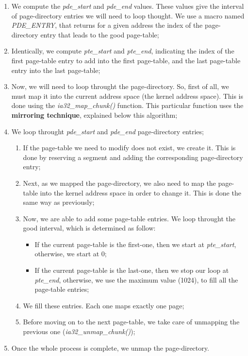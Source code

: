 \begin{enumerate}
\item
  We compute the \textit{pde\_start} and \textit{pde\_end}
  values. These values give the interval of page-directory entries we
  will need to loop thought. We use a macro named \textit{PDE\_ENTRY},
  that returns for a given address the index of the page-directory
  entry that leads to the good page-table;
\item
  Identically, we compute \textit{pte\_start} and \textit{pte\_end},
  indicating the index of the first page-table entry to add into the
  first page-table, and the last page-table entry into the last
  page-table;
\item
  Now, we will need to loop throught the page-directory. So, first of
  all, we must map it into the current address space (the kernel
  address space). This is done using the \textit{ia32\_map\_chunk()}
  function. This particular function uses the \textbf{mirroring
  technique}, explained below this algorithm;
\item
  We loop throught \textit{pde\_start} and \textit{pde\_end}
  page-directory entries;
  \begin{enumerate}
  \item
    If the page-table we need to modify does not exist, we create
    it. This is done by reserving a segment and adding the
    corresponding page-directory entry;
  \item
    Next, as we mapped the page-directory, we also need to map the
    page-table into the kernel address space in order to change
    it. This is done the same way as previously;
  \item
    Now, we are able to add some page-table entries. We loop
    throught the good interval, which is determined as follow:
    \begin{itemize}
    \item
      If the current page-table is the first-one, then we start at
      \textit{pte\_start}, otherwise, we start at 0;
    \item
      If the current page-table is the last-one, then we stop our loop
      at \textit{pte\_end}, otherwise, we use the maximum value
      (1024), to fill all the page-table entries;
    \end{itemize}
    \item
      We fill these entries. Each one maps exactly one page;
    \item
      Before moving on to the next page-table, we take care of
      unmapping the previous one (\textit{ia32\_unmap\_chunk()});
  \end{enumerate}
\item
  Once the whole process is complete, we unmap the page-directory.
\end{enumerate}

